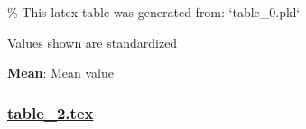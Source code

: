\documentclass[11pt]{article}
\begin{document}
\begin{codeoutput}
\% This latex table was generated from: `table\_0.pkl`
\begin{table}[h]
\caption{Descriptive statistics of Age stratified by Sex and Immunity Group}
\label{table:table0}
\begin{threeparttable}
\renewcommand{\TPTminimum}{\linewidth}
\begin{tablenotes}
\footnotesize
\item Values shown are standardized
\item \textbf{Mean}: Mean value
\end{tablenotes}
\end{threeparttable}
\end{table}
\end{codeoutput}

\subsubsection*{\hyperlink{code-LaTeX Table Design-table-2-tex}{table\_2.tex}}
\end{document}
